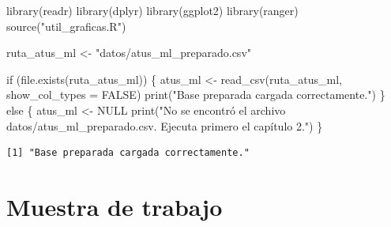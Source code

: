 \documentclass[
  spanish,
  11pt,
  letterpaper,
]{book}
\newenvironment{Shaded}{}{}
\newcommand{\AttributeTok}[1]{\textcolor[rgb]{0.84,0.23,0.29}{#1}}
\newcommand{\ConstantTok}[1]{\textcolor[rgb]{0.00,0.36,0.77}{#1}}
\newcommand{\ControlFlowTok}[1]{\textcolor[rgb]{0.84,0.23,0.29}{#1}}
\newcommand{\FunctionTok}[1]{\textcolor[rgb]{0.44,0.26,0.76}{#1}}
\newcommand{\NormalTok}[1]{\textcolor[rgb]{0.14,0.16,0.18}{#1}}
\newcommand{\OtherTok}[1]{\textcolor[rgb]{0.44,0.26,0.76}{#1}}
\newcommand{\StringTok}[1]{\textcolor[rgb]{0.01,0.18,0.38}{#1}}
\begin{document}
\begin{Shaded}
\begin{Highlighting}[]
\FunctionTok{library}\NormalTok{(readr)}
\FunctionTok{library}\NormalTok{(dplyr)}
\FunctionTok{library}\NormalTok{(ggplot2)}
\FunctionTok{library}\NormalTok{(ranger)}
\FunctionTok{source}\NormalTok{(}\StringTok{"util\_graficas.R"}\NormalTok{)}

\NormalTok{ruta\_atus\_ml }\OtherTok{\textless{}{-}} \StringTok{"datos/atus\_ml\_preparado.csv"}

\ControlFlowTok{if}\NormalTok{ (}\FunctionTok{file.exists}\NormalTok{(ruta\_atus\_ml)) \{}
\NormalTok{  atus\_ml }\OtherTok{\textless{}{-}} \FunctionTok{read\_csv}\NormalTok{(ruta\_atus\_ml, }\AttributeTok{show\_col\_types =} \ConstantTok{FALSE}\NormalTok{)}
  \FunctionTok{print}\NormalTok{(}\StringTok{"Base preparada cargada correctamente."}\NormalTok{)}
\NormalTok{\} }\ControlFlowTok{else}\NormalTok{ \{}
\NormalTok{  atus\_ml }\OtherTok{\textless{}{-}} \ConstantTok{NULL}
  \FunctionTok{print}\NormalTok{(}\StringTok{"No se encontró el archivo datos/atus\_ml\_preparado.csv. Ejecuta primero el capítulo 2."}\NormalTok{)}
\NormalTok{\}}
\end{Highlighting}
\end{Shaded}

\begin{verbatim}
[1] "Base preparada cargada correctamente."
\end{verbatim}

\section{Muestra de trabajo}\label{muestra-de-trabajo}
\end{document}
